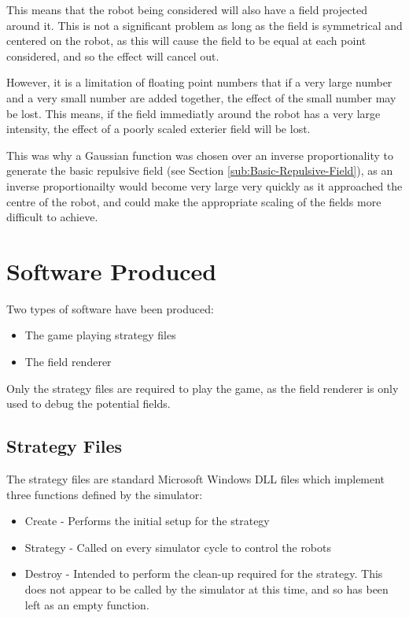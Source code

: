 \documentclass[10pt]{article}
\begin{document}
This means that the robot being considered will also have a field projected
around it.  This is not a significant problem as long as the field is
symmetrical and centered on the robot, as this will cause the field to be equal
at each point considered, and so the effect will cancel out.

However, it is a limitation of floating point numbers that if a very large
number and a very small number are added together, the effect of the small
number may be lost.  This means, if the field immediatly around the robot has a
very large intensity, the effect of a poorly scaled exterier field will be lost.

This was why a Gaussian function was chosen over an inverse proportionality to
generate the basic repulsive field (see Section
\ref{sub:Basic-Repulsive-Field}), as an inverse proportionailty would become
very large very quickly as it approached the centre of the robot, and could make
the appropriate scaling of the fields more difficult to achieve.

\section{Software Produced}

Two types of software have been produced:
\begin{itemize}
\item The game playing strategy files
\item The field renderer
\end{itemize}

Only the strategy files are required to play the game, as the field renderer is
only used to debug the potential fields.

\subsection{Strategy Files}

The strategy files are standard Microsoft Windows DLL files which
implement three functions defined by the simulator:
\begin{itemize}
\item Create - Performs the initial setup for the strategy
\item Strategy - Called on every simulator cycle to control the robots
\item Destroy - Intended to perform the clean-up required for the strategy.
This does not appear to be called by the simulator at this time, and so has been
 left as an empty function.
\end{itemize}
\end{document}
